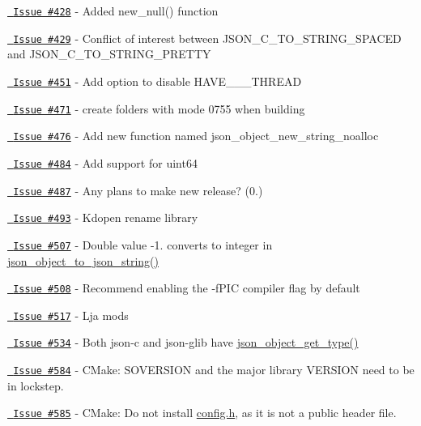 \begin{DoxyItemize}
\item \href{https://github.com/json-c/json-c/issues/428}{\texttt{ Issue \#428}} -\/ Added new\+\_\+null() function
\item \href{https://github.com/json-c/json-c/issues/429}{\texttt{ Issue \#429}} -\/ Conflict of interest between JSON\+\_\+\+C\+\_\+\+TO\+\_\+\+STRING\+\_\+\+SPACED and JSON\+\_\+\+C\+\_\+\+TO\+\_\+\+STRING\+\_\+\+PRETTY
\item \href{https://github.com/json-c/json-c/issues/451}{\texttt{ Issue \#451}} -\/ Add option to disable HAVE\+\_\+\+\_\+\+\_\+\+THREAD
\item \href{https://github.com/json-c/json-c/issues/471}{\texttt{ Issue \#471}} -\/ create folders with mode 0755 when building
\item \href{https://github.com/json-c/json-c/issues/476}{\texttt{ Issue \#476}} -\/ Add new function named json\+\_\+object\+\_\+new\+\_\+string\+\_\+noalloc
\item \href{https://github.com/json-c/json-c/issues/484}{\texttt{ Issue \#484}} -\/ Add support for uint64
\item \href{https://github.com/json-c/json-c/issues/487}{\texttt{ Issue \#487}} -\/ Any plans to make new release? (0.)
\item \href{https://github.com/json-c/json-c/issues/493}{\texttt{ Issue \#493}} -\/ Kdopen rename library
\item \href{https://github.com/json-c/json-c/issues/507}{\texttt{ Issue \#507}} -\/ Double value -\/1. converts to integer in \mbox{\hyperlink{json__object_8h_ab7390c22baa1700d977c2af6b22d43a4}{json\+\_\+object\+\_\+to\+\_\+json\+\_\+string()}}
\item \href{https://github.com/json-c/json-c/issues/508}{\texttt{ Issue \#508}} -\/ Recommend enabling the {\ttfamily -\/f\+PIC} compiler flag by default
\item \href{https://github.com/json-c/json-c/issues/517}{\texttt{ Issue \#517}} -\/ Lja mods
\item \href{https://github.com/json-c/json-c/issues/534}{\texttt{ Issue \#534}} -\/ Both json-\/c and json-\/glib have \mbox{\hyperlink{json__object_8h_af256a3a7910e271a2b9735e5044c3827}{json\+\_\+object\+\_\+get\+\_\+type()}}
\item \href{https://github.com/json-c/json-c/issues/584}{\texttt{ Issue \#584}} -\/ CMake\+: SOVERSION and the major library VERSION need to be in lockstep.
\item \href{https://github.com/json-c/json-c/issues/585}{\texttt{ Issue \#585}} -\/ CMake\+: Do not install \mbox{\hyperlink{config_8h_source}{config.\+h}}, as it is not a public header file.

\end{DoxyItemize}
